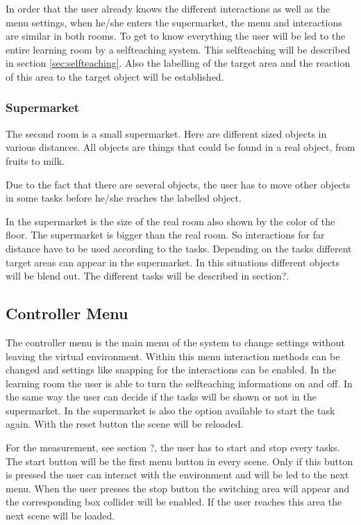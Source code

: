 In order that the user already knows the different interactions as well as the menu settings, when he/she enters the supermarket, the menu and interactions are similar in both rooms. To get to know everything the user will be led to the entire learning room by a selfteaching system. This selfteaching will be described in section \ref{sec:selfteaching}. Also the labelling of the target area  and the reaction of this area to the target object will be established.

\subsubsection{Supermarket} \label{sec:supermarket} %
The second room is a small supermarket. Here are different sized objects in various distances. All objects are things that could be found in a real object, from fruits to milk.

Due to the fact that there are several objects, the user has to move other objects in some tasks before he/she reaches the labelled object. 

In the supermarket is the size of the real room also shown by the color of the floor. The supermarket is bigger than the real room. So interactions for far distance have to be used according to the tasks. Depending on the tasks different target areas can appear in the supermarket. In this situations different objects will be blend out. The different tasks will be described in section?. %

\subsection{Controller Menu} \label{sec:Menu}
The controller menu is the main menu of the system to change settings without leaving the virtual environment. Within this menu interaction methods can be changed and settings like snapping for the interactions can be enabled. In the learning room	the user is able to turn the selfteaching informations on and off. In the same way the user can decide if the tasks will be shown or not in the supermarket. In the supermarket is also the option available to start the task again. With the reset button the scene will be reloaded.

For the measurement, see section ?, the user has to start and stop every tasks. The start button will be the first menu button in every scene. Only if this button is pressed the user can interact with the environment and will be led to the next menu. When the user presses the stop button the switching area will appear and the corresponding box collider will be enabled. If the user reaches this area the next scene will be loaded.


